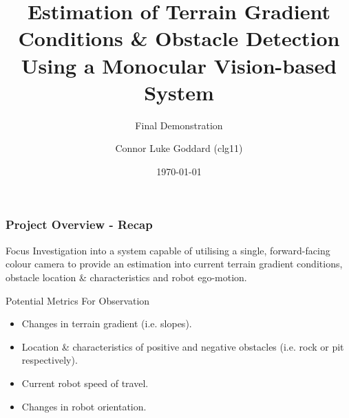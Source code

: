 \documentclass[10pt, compress]{beamer}
\title{Estimation of Terrain Gradient Conditions \& Obstacle Detection Using a Monocular Vision-based System}
\subtitle{Final Demonstration}
\date{\today}
\author{Connor Luke Goddard (clg11)}
\institute{Department of Computer Science, Aberystwyth University}
\begin{document}
\maketitle


%  
%	
%
%  
%		
%
%	
%
%


\begin{frame}[fragile]
  \frametitle{Project Overview - Recap}
  
  \begin{block}{Focus}
    Investigation into a system capable of utilising a single, forward-facing colour camera to provide an estimation into current terrain gradient conditions, obstacle location \& characteristics and robot ego-motion. 
  \end{block}
  
  
  \begin{block}{Potential Metrics For Observation}
   
  \begin{itemize}[label={\textbullet}]
  	\item Changes in terrain gradient (i.e. slopes).
  	\item Location \& characteristics of positive and negative obstacles (i.e. rock or pit respectively).
  	\item Current robot speed of travel.
  	\item Changes in robot orientation.
  \end{itemize}
  
 \end{block}
 
\end{frame}
\end{document}
